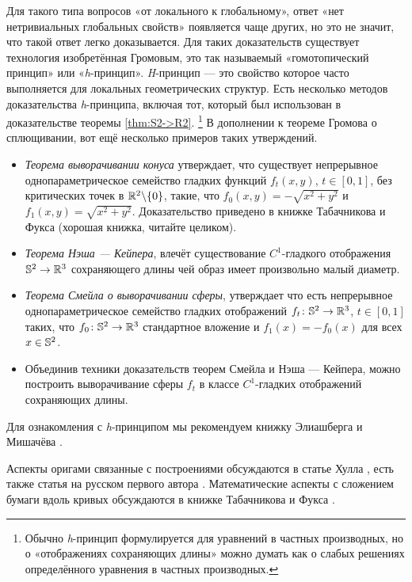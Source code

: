 Для такого типа вопросов «от локального к глобальному»,
ответ «нет нетривиальных глобальных свойств»
появляется чаще других, 
но это не значит, что такой ответ легко доказывается.
Для таких доказательств существует технология изобретённая Громовым, 
это так называемый «гомотопический принцип» или «\textit{h}-принцип».
\textit{H}-принцип --- 
это свойство которое часто выполняется для локальных геометрических структур.
Есть несколько методов доказательства \textit{h}-принципа, 
включая тот, который был использован в доказательстве теоремы \ref{thm:S2->R2}.%
\footnote{Обычно \textit{h}-принцип формулируется для уравнений в частных производных, 
но о «отображениях сохраняющих длины» можно думать как о слабых решениях определённого уравнения в частных производных.}
В дополнении к теореме Громова о сплющивании, 
вот ещё несколько примеров таких утверждений.
\begin{itemize}
\item \emph{Теорема выворачивании конуса} утверждает, 
что существует непрерывное однопараметрическое семейство гладких функций $f_t(x,y)$, $t\in[0,1]$, без критических точек в $\mathbb{R}^2\backslash\{0\}$, 
такие, что
$f_0(x,y)=-\sqrt{x^2+y^2}$ и $f_{1}(x,y)=\sqrt{x^2+y^2}$.
Доказательство приведено в книжке Табачникова и Фукса \cite[Лекция 27]{TF} (хорошая книжка, читайте целиком).
\item \emph{Теорема Нэша — Кейпера}, влечёт существование $C^1$-гладкого отображения $\mathbb{S}^2\to\mathbb{R}^3$ сохраняющего длины чей образ имеет произвольно малый диаметр.
\item \emph{Теорема Смейла о выворачивании сферы}, 
утверждает что есть непрерывное однопараметрическое семейство гладких отображений $f_t\:\SS^2\z\to \RR^3$, $t\in[0,1]$ 
таких, что $f_0\colon\mathbb{S}^2\to \mathbb{R}^3$ 
стандартное вложение и $f_1(x)=-f_0(x)$ для всех $x\in \mathbb{S}^2$.
\item Объединив техники доказательств теорем Смейла и Нэша --- Кейпера, 
можно построить выворачивание сферы $f_t$ в классе $C^1$-гладких отображений сохраняющих длины. 
\end{itemize}
 
Для ознакомления с \textit{h}-принципом 
мы рекомендуем книжку Элиашберга и Мишачёва \cite{eliashberg-mishachev}.

Аспекты оригами связанные с построениями обсуждаются в статье Хулла \cite{hull},
есть также статья на русском первого автора \cite{petrunin-origami}.
Математические аспекты с сложением бумаги вдоль кривых обсуждаются в книжке Табачникова и Фукса \cite[Лекция 15]{TF}.